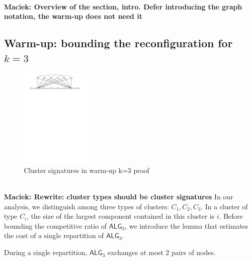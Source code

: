 \documentclass[manuscript,screen=true, review, anonymous]{acmart}
\newcommand{\TAlg}{{\ensuremath{\textsf{ALG}_{3}}}\xspace}
\newcommand\maciek[1]{\color{brown}\textbf{\\ Maciek: #1}\color{black}}
\begin{document}
\maciek{Overview of the section, intro. Defer introducing the graph notation, the warm-up does not need it}

\subsection{Warm-up: bounding the reconfiguration for $k=3$}


\begin{figure}[H]
  \centering
    \includegraphics[width=0.3\textwidth]{figs/substitute}
    \caption{Cluster signatures in warm-up k=3 proof}
  \end{figure}

\maciek{Rewrite: cluster types should be cluster signatures}
In our analysis, we distinguish among three types of clusters: $C_1, C_2, C_3$. In a cluster of type $C_i$, the size of the largest component contained in this cluster is $i$.
Before bounding the competitive ratio of \TAlg, we introduce the lemma that estimates the cost of a single repartition of \TAlg.

\begin{lemma}
  \label{lem:1req}
  During a single repartition, \TAlg exchanges at most $2$ pairs of nodes.
\end{lemma}
\end{document}
